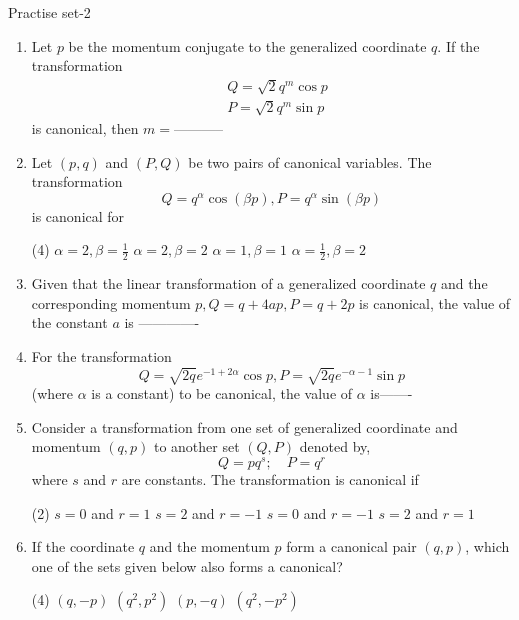 \newpage
\begin{abox}
	Practise set-2
\end{abox}
\begin{enumerate}
	\item  Let $p$ be the momentum conjugate to the generalized coordinate $q$. If the transformation
	$$
	\begin{aligned}
	&Q=\sqrt{2} q^{m} \cos p \\
	&P=\sqrt{2} q^{m} \sin p
	\end{aligned}
	$$
	is canonical, then $m=$-----------
{}
	\item  Let $(p, q)$ and $(P, Q)$ be two pairs of canonical variables. The transformation
	$$
	Q=q^{\alpha} \cos (\beta p), P=q^{\alpha} \sin (\beta p)
	$$
	is canonical for
{}
	 \begin{tasks}(4)
		\task[\textbf{a.}]$\alpha=2, \beta=\frac{1}{2}$
		\task[\textbf{b.}]$\alpha=2, \beta=2$
		\task[\textbf{c.}]$\alpha=1, \beta=1$
		\task[\textbf{d.}] $\alpha=\frac{1}{2}, \beta=2$
	\end{tasks}
	\item  Given that the linear transformation of a generalized coordinate $q$ and the corresponding momentum $p, Q=q+4 a p, P=q+2 p$ is canonical, the value of the constant $a$ is -------------
	{}
\item  For the transformation
$$
Q=\sqrt{2 q} e^{-1+2 \alpha} \cos p, P=\sqrt{2 q} e^{-\alpha-1} \sin p
$$
(where $\alpha$ is a constant) to be canonical, the value of $\alpha$ is-------
{}
	\item  Consider a transformation from one set of generalized coordinate and momentum $(q, p)$ to another set $(Q, P)$ denoted by,
	$$
	Q=p q^{s} ; \quad P=q^{r}
	$$
	where $s$ and $r$ are constants. The transformation is canonical if
{}
	 \begin{tasks}(2)
		\task[\textbf{a.}]$s=0$ and $r=1$
		\task[\textbf{b.}]$s=2$ and $r=-1$
		\task[\textbf{c.}] $s=0$ and $r=-1$
		\task[\textbf{d.}] $s=2$ and $r=1$
	\end{tasks}
	\item  If the coordinate $q$ and the momentum $p$ form a canonical pair $(q, p)$, which one of the sets given below also forms a canonical?
{}
	 \begin{tasks}(4)
		\task[\textbf{a.}]$(q,-p)$
		\task[\textbf{b.}]$\left(q^{2}, p^{2}\right)$
		\task[\textbf{c.}]$(p,-q)$
		\task[\textbf{d.}] $\left(q^{2},-p^{2}\right)$

\end{tasks}
\end{enumerate}
